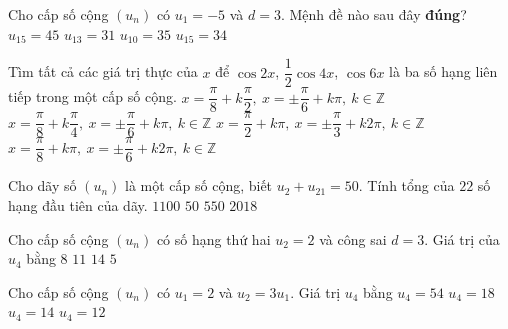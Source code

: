 \begin{ex}%
	Cho cấp số cộng $(u_n)$ có $u_1=-5$ và $d=3$. Mệnh đề nào sau đây \textbf{đúng}?
	\choice
	{$u_{15}=45$}
	{\True $u_{13}=31$}
	{$u_{10}=35$}
	{$u_{15}=34$}
\end{ex}%
\begin{ex}%
	Tìm tất cả các giá trị thực của $x$ để $\cos 2x$, $\dfrac{1}{2}\cos 4x$, $\cos 6x$ là ba số hạng liên tiếp trong một cấp số cộng.
	\choice
	{$ x=\dfrac{\pi}{8}+k\dfrac{\pi}{2},~x=\pm \dfrac{\pi}{6}+k\pi,~k \in \mathbb{Z} $}
	{\True $ x=\dfrac{\pi}{8}+k\dfrac{\pi}{4},~x=\pm \dfrac{\pi}{6}+k\pi,~k \in \mathbb{Z} $}
	{$ x=\dfrac{\pi}{2}+k\pi,~x=\pm \dfrac{\pi}{3}+k2\pi,~k \in \mathbb{Z} $}
	{$ x=\dfrac{\pi}{8}+k\pi,~x=\pm \dfrac{\pi}{6}+k2\pi,~k \in \mathbb{Z} $}
\end{ex}%
\begin{ex}%
Cho dãy số $(u_n)$ là một cấp số cộng, biết $u_2+u_{21}=50$. Tính tổng của $ 22 $ số hạng đầu tiên của dãy.
\choice
{$1100$}
{$50$}
{\True $550$}
{$2018$}
\end{ex}%
\begin{ex}%
	Cho cấp số cộng $(u_n)$ có số hạng thứ hai $u_2=2$ và công sai $d=3$. Giá trị của $u_4$ bằng
	\choice
	{\True $8$}
	{$11$}
	{$14$}
	{$5$}
\end{ex}%
\begin{ex}%
	Cho cấp số cộng $\left(u_n\right)$ có $u_1=2$ và $u_2=3u_1$. Giá trị $u_4$ bằng
	\choice
	{$u_4=54$}
	{$u_4=18$}
	{\True $u_4=14$}
	{$u_4=12$}
\end{ex}